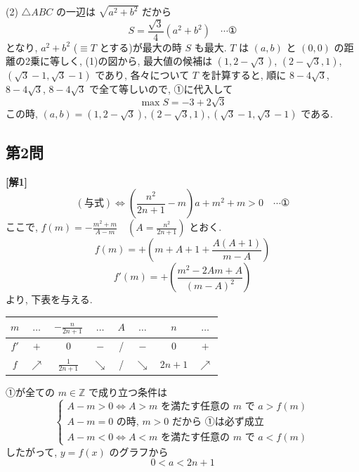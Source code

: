 \documentclass[../main.tex]{subfiles}
\begin{document}
\bigskip

\noindent
(2) $\triangle ABC$ の一辺は $\sqrt{a^2+b^2}$ だから
\[
  S = \frac{\sqrt{3}}{4}(a^2+b^2) \quad \cdots \text{①}
\]
となり, $a^2+b^2$ ($\equiv T$ とする)が最大の時 $S$ も最大. $T$ は $(a,b)$ と $(0,0)$ の距離の2乗に等しく, (1)の図から, 最大値の候補は $(1, 2-\sqrt{3})$, $(2-\sqrt{3}, 1)$, $(\sqrt{3}-1, \sqrt{3}-1)$ であり, 各々について $T$ を計算すると, 順に $8-4\sqrt{3}$, $8-4\sqrt{3}$, $8-4\sqrt{3}$ で全て等しいので, ①に代入して
\[
  \max S = -3 + 2\sqrt{3}
\]
この時, $(a,b) = (1, 2-\sqrt{3}), (2-\sqrt{3}, 1), (\sqrt{3}-1, \sqrt{3}-1)$ である.

\newpage

\subsection*{第2問}

\noindent
\textbf{[解1]}
\[
  (\text{与式}) \iff \left( \frac{n^2}{2n+1} - m \right) a + m^2 + m > 0 \quad \cdots \text{①}
\]
ここで, $f(m) = -\frac{m^2+m}{A-m} \quad \left(A = \frac{n^2}{2n+1}\right)$ とおく.
\[
  f(m) = +\left( m+A+1 + \frac{A(A+1)}{m-A} \right)
\]
\[
  f'(m) = +\left( \frac{m^2-2Am+A}{(m-A)^2} \right)
\]
より, 下表を与える.

\begin{center}
  \begin{tabular}{c|c|c|c|c|c|c|c}
    $m$ & $\dots$ & $-\frac{n}{2n+1}$ & $\dots$ & $A$ & $\dots$ & $n$ & $\dots$ \\ \hline
    $f'$ & $+$ & $0$ & $-$ & / & $-$ & $0$ & $+$ \\ \hline
    $f$ & $\nearrow$ & $\frac{1}{2n+1}$ & $\searrow$ & / & $\searrow$ & $2n+1$ & $\nearrow$
  \end{tabular}
\end{center}

\bigskip

\noindent
①が全ての $m \in \mathbb{Z}$ で成り立つ条件は
\[
  \begin{cases}
    A - m > 0 \iff A > m \text{ を満たす任意の } m \text{ で } a > f(m) \\
    A - m = 0 \text{ の時, } m > 0 \text{ だから ①は必ず成立} \\
    A - m < 0 \iff A < m \text{ を満たす任意の } m \text{ で } a < f(m)
  \end{cases}
\]
したがって, $y=f(x)$ のグラフから
\[
  0 < a < 2n+1
\]
\end{document}
